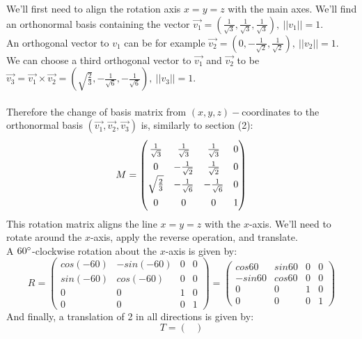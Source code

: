 \documentclass{article}
\newcommand{\norm}[1]{\vert\vert#1\vert\vert}
\begin{document}
\begin{enumerate}
    We'll first need to align the rotation axis $x=y=z$ with the main axes. We'll find an orthonormal basis containing the vector $\vec{v_1} = \left(\frac{1}{\sqrt{3}}, \frac{1}{\sqrt{3}}, \frac{1}{\sqrt{3}} \right),\ \norm{v_1} = 1$.\\
    An orthogonal vector to $v_1$ can be for example $\vec{v_2} = \left(0, -\frac{1}{\sqrt{2}}, \frac{1}{\sqrt{2}}\right),\ \norm{v_2} = 1$.\\
    We can choose a third orthogonal vector to $\vec{v_1}$ and $\vec{v_2}$ to be $\vec{v_3} = \vec{v_1}\times\vec{v_2} = \left(\sqrt{\frac{2}{3}},-\frac{1}{\sqrt{6}}, -\frac{1}{\sqrt{6}}\right),\ \norm{v_3} = 1$.\\\\
    Therefore the change of basis matrix from $(x,y,z)-$coordinates to the orthonormal basis $\left(\vec{v_1}, \vec{v_2},\vec{v_3}\right)$ is, similarly to section (2):
    $$
        \begingroup
        \renewcommand*{\arraystretch}{1.5}
            M = \begin{pmatrix}
                \frac{1}{\sqrt{3}}&\frac{1}{\sqrt{3}}&\frac{1}{\sqrt{3}}&0\\
                0&-\frac{1}{\sqrt{2}}&\frac{1}{\sqrt{2}}&0\\
                \sqrt{\frac{2}{3}}&-\frac{1}{\sqrt{6}}&-\frac{1}{\sqrt{6}}&0\\
                0&0&0&1
            \end{pmatrix}
        \endgroup
    $$
    This rotation matrix aligns the line $x=y=z$ with the $x$-axis. We'll need to rotate around the $x$-axis, apply the reverse operation, and translate.\\
    A $60\degree$-clockwise rotation about the $x$-axis is given by:
    $$
        R = \begin{pmatrix}
            cos(-60)&-sin(-60)&0&0\\
            sin(-60)&cos(-60)&0&0\\
            0&0&1&0\\
            0&0&0&1
        \end{pmatrix} = \begin{pmatrix}
            cos60&sin60&0&0\\
            -sin60&cos60&0&0\\
            0&0&1&0\\
            0&0&0&1
        \end{pmatrix}
    $$
    And finally, a translation of 2 in all directions is given by:
    $$
        T = \begin{pmatrix}

\end{pmatrix}$$
\end{enumerate}
\end{document}
